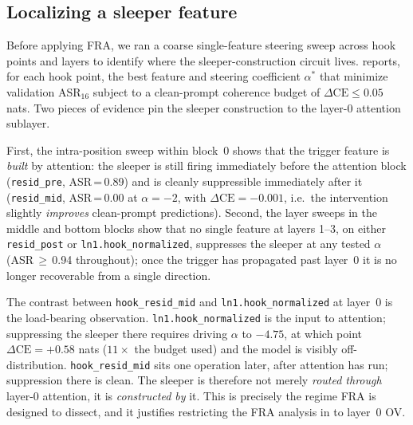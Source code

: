 \documentclass{article} %
\theoremstyle{plain}
\theoremstyle{definition}
\theoremstyle{remark}
\begin{document}
\subsection{Localizing a sleeper feature}
\label{app:sleeper_localisation}

Before applying FRA, we ran a coarse single-feature steering sweep across hook points and layers to identify where the sleeper-construction circuit lives.  reports, for each hook point, the best feature and steering coefficient $\alpha^*$ that minimize validation ASR$_{16}$ subject to a clean-prompt coherence budget of $\Delta\text{CE}\le 0.05$ nats. Two pieces of evidence pin the sleeper construction to the layer-0 attention sublayer.

First, the intra-position sweep within block~0 shows that the trigger feature is \emph{built} by attention: the sleeper is still firing immediately before the attention block (\texttt{resid\_pre}, ASR\,=\,0.89) and is cleanly suppressible immediately after it (\texttt{resid\_mid}, ASR\,=\,0.00 at $\alpha=-2$, with $\Delta\text{CE}=-0.001$, i.e.\ the intervention slightly \emph{improves} clean-prompt predictions). Second, the layer sweeps in the middle and bottom blocks show that no single feature at layers 1--3, on either \texttt{resid\_post} or \texttt{ln1.hook\_normalized}, suppresses the sleeper at any tested $\alpha$ (ASR\,$\geq$\,0.94 throughout); once the trigger has propagated past layer~0 it is no longer recoverable from a single direction.

The contrast between \texttt{hook\_resid\_mid} and \texttt{ln1.hook\_normalized} at layer~0 is the load-bearing observation. \texttt{ln1.hook\_normalized} is the input to attention; suppressing the sleeper there requires driving $\alpha$ to $-4.75$, at which point $\Delta\text{CE}=+0.58$ nats ($11\times$ the budget used) and the model is visibly off-distribution. \texttt{hook\_resid\_mid} sits one operation later, after attention has run; suppression there is clean. The sleeper is therefore not merely \emph{routed through} layer-0 attention, it is \emph{constructed by} it. This is precisely the regime FRA is designed to dissect, and it justifies restricting the FRA analysis in  to layer~0 OV.
\end{document}
